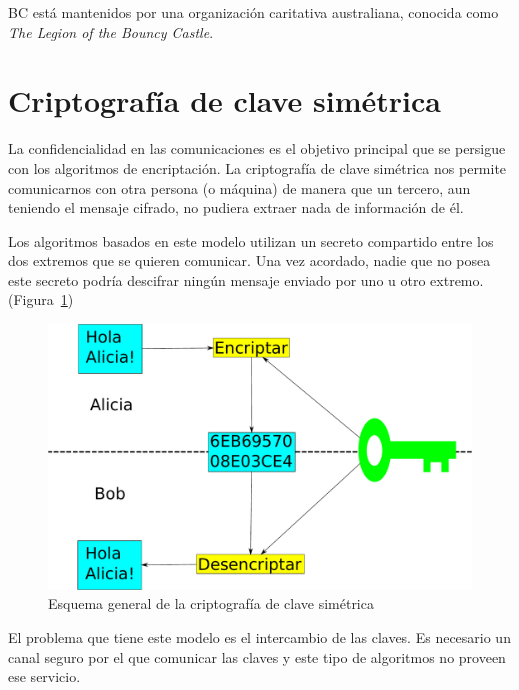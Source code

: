 BC está mantenidos por una organización caritativa australiana, conocida como \emph{The Legion of the Bouncy Castle}. \emph{\parencite{Reference4}}


\section{Criptografía de clave simétrica}

La confidencialidad en las comunicaciones es el objetivo principal que se persigue con los algoritmos de encriptación. La criptografía de clave simétrica nos permite comunicarnos con otra persona (o máquina) de manera que un tercero, aun teniendo el mensaje cifrado, no pudiera extraer nada de información de él.

Los algoritmos basados en este modelo utilizan un secreto compartido entre los dos extremos que se quieren comunicar. Una vez acordado, nadie que no posea este secreto podría descifrar ningún mensaje enviado por uno u otro extremo. (Figura~\ref{fig:SymmetricKeyEncryption})

\begin{figure}[ht]
  \centering
  \includegraphics[scale=0.4]{Figures/SymmetricKeyEncryption}
  \decoRule
  \caption[Criptografía de clave simétrica (Esquema)]{Esquema general de la criptografía de clave simétrica}
  \label{fig:SymmetricKeyEncryption}
\end{figure}

El problema que tiene este modelo es el intercambio de las claves. Es necesario un canal seguro por el que comunicar las claves y este tipo de algoritmos no proveen ese servicio. \emph{\parencite{Reference19}}

